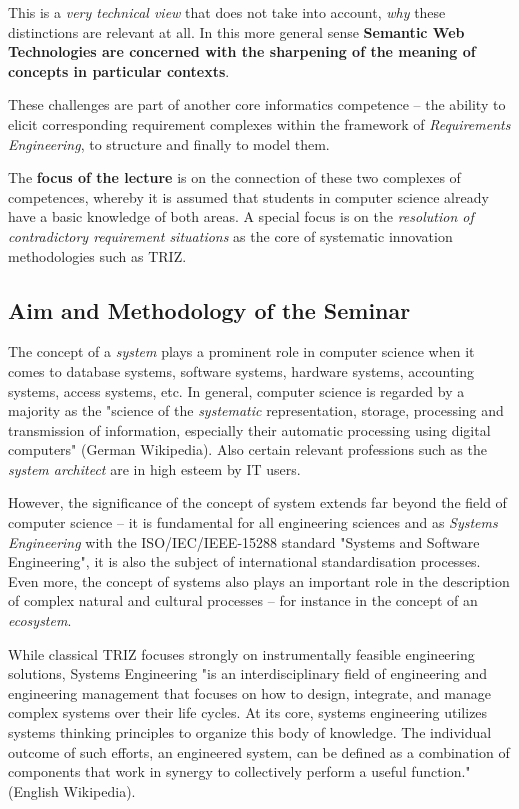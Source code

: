 \documentclass[11pt,a4paper]{article}
\begin{document}
This is a \emph{very technical view} that does not take into account,
\emph{why} these distinctions are relevant at all. In this more general sense
\textbf{Semantic Web Technologies are concerned with the sharpening of the
  meaning of concepts in particular contexts}.

These challenges are part of another core informatics competence – the ability
to elicit corresponding requirement complexes within the framework of
\emph{Requirements Engineering}, to structure and finally to model them.

The \textbf{focus of the lecture} is on the connection of these two complexes
of competences, whereby it is assumed that students in computer science
already have a basic knowledge of both areas. A special focus is on the
\emph{resolution of contradictory requirement situations} as the core of
systematic innovation methodologies such as TRIZ.

\subsection{Aim and Methodology of the Seminar}

The concept of a \emph{system} plays a prominent role in computer science when
it comes to database systems, software systems, hardware systems, accounting
systems, access systems, etc.  In general, computer science is regarded by a
majority as the "science of the \emph{systematic} representation, storage,
processing and transmission of information, especially their automatic
processing using digital computers" (German Wikipedia).  Also certain relevant
professions such as the \emph{system architect} are in high esteem by IT
users.

However, the significance of the concept of system extends far beyond the
field of computer science -- it is fundamental for all engineering sciences
and as \emph{Systems Engineering} with the ISO/IEC/IEEE-15288 standard
"Systems and Software Engineering", it is also the subject of international
standardisation processes.  Even more, the concept of systems also plays an
important role in the description of complex natural and cultural processes --
for instance in the concept of an \emph{ecosystem}.

While classical TRIZ focuses strongly on instrumentally feasible engineering
solutions, Systems Engineering "is an interdisciplinary field of engineering
and engineering management that focuses on how to design, integrate, and
manage complex systems over their life cycles. At its core, systems
engineering utilizes systems thinking principles to organize this body of
knowledge. The individual outcome of such efforts, an engineered system, can
be defined as a combination of components that work in synergy to collectively
perform a useful function." (English Wikipedia). 
\end{document}
